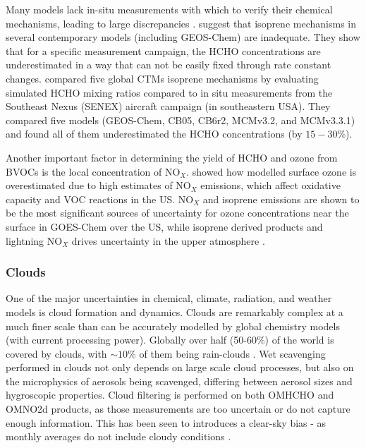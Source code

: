       Many models lack in-situ measurements with which to verify their chemical mechanisms, leading to large discrepancies \parencite{Marvin2017}.
      \textcite{Marvin2017} suggest that isoprene mechanisms in several contemporary models (including GEOS-Chem) are inadequate. 
      They show that for a specific measurement campaign, the HCHO concentrations are underestimated in a way that can not be easily fixed through rate constant changes.
      \textcite{Marvin2017} compared five global CTMs isoprene mechanisms by evaluating simulated HCHO mixing ratios compared to in situ measurements from the Southeast Nexus (SENEX) aircraft campaign (in southeastern USA).
      They compared five models (GEOS-Chem, CB05, CB6r2, MCMv3.2, and MCMv3.3.1) and found all of them underestimated the HCHO concentrations (by $15 - 30\%$).
      
      Another important factor in determining the yield of HCHO and ozone from BVOCs is the local concentration of NO$_X$.
      \textcite{Travis2016} showed how modelled surface ozone is overestimated due to high estimates of NO$_X$ emissions, which affect oxidative capacity and VOC reactions in the US.
      NO$_X$ and isoprene emissions are shown to be the most significant sources of uncertainty for ozone concentrations near the surface in GOES-Chem over the US, while isoprene derived products and lightning NO$_X$ drives uncertainty in the upper atmosphere \parencite{Christian2017}.
      
    
    \subsubsection{Clouds}
      \label{LR:Models:Uncert:Clouds}
      One of the major uncertainties in chemical, climate, radiation, and weather models is cloud formation and dynamics.
      Clouds are remarkably complex at a much finer scale than can be accurately modelled by global chemistry models (with current processing power).
      Globally over half (50-60\%) of the world is covered by clouds, with $\sim10\%$ of them being rain-clouds \parencite{Kanakidou2005}.
      Wet scavenging performed in clouds not only depends on large scale cloud processes, but also on the microphysics of aerosols being scavenged, differing between aerosol sizes and hygroscopic properties.
      Cloud filtering is performed on both OMHCHO and OMNO2d products, as those measurements are too uncertain or do not capture enough information. 
      This has been seen to introduces a clear-sky bias - as monthly averages do not include cloudy conditions \parencite{Surl2018}.
      
